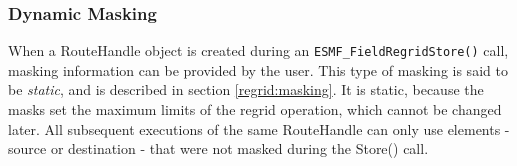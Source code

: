  
\setlength{\oldparskip}{\parskip}
\setlength{\parskip}{1.5ex}
\setlength{\oldparindent}{\parindent}
\setlength{\parindent}{0pt}
\setlength{\oldbaselineskip}{\baselineskip}
\setlength{\baselineskip}{11pt}
 
\def\bv{\begin{verbatim}}
\def\ev{\end{verbatim}}
\def\be{\begin{equation}}
\def\ee{\end{equation}}
\def\bea{\begin{eqnarray}}
\def\eea{\end{eqnarray}}
\def\bi{\begin{itemize}}
\def\ei{\end{itemize}}
\def\bn{\begin{enumerate}}
\def\en{\end{enumerate}}
\def\bd{\begin{description}}
\def\ed{\end{description}}
\def\({\left (}
\def\){\right )}
\def\[{\left [}
\def\]{\right ]}
\def\<{\left  \langle}
\def\>{\right \rangle}
\def\cI{{\cal I}}
\def\diag{\mathop{\rm diag}}
\def\tr{\mathop{\rm tr}}


 

   \subsubsection{Dynamic Masking}
   \label{RH:DynMask}
  
   When a RouteHandle object is created during an {\tt ESMF\_FieldRegridStore()}
   call, masking information can be provided by the user. This type of masking
   is said to be {\em static}, and is described in section \ref{regrid:masking}.
   It is static, because the masks set the maximum limits of the regrid 
   operation, which cannot be changed later. All subsequent executions of the
   same RouteHandle can only use elements - source or destination - 
   that were not masked during the Store() call.
  
